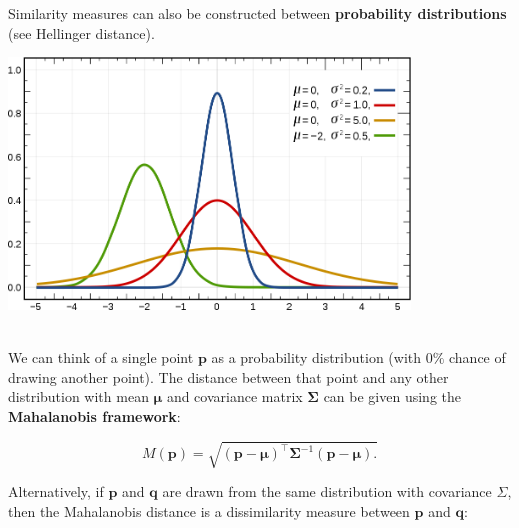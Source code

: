 \documentclass[20pt,landscape,footrule,headrule]{foils}
\newcommand{\newl}{\newline\newline}
\begin{document}
Similarity measures can also be constructed between \textbf{probability distributions} (see Hellinger distance). \newpage\  \begin{center}
\includegraphics[width=0.8\textwidth]{Images/distributions.png}
\end{center}\newpage \ \\ \noindent
We can think of a single point $\mathbf{p}$ as a probability distribution (with $0\%$ chance of drawing another point). \newl The distance between that point and any other distribution with mean $\mathbf{\mu}$ and covariance matrix $\mathbf{\Sigma}$ can be given using the \textbf{Mahalanobis framework}:

$$
M(\mathbf{p})=\sqrt{(\mathbf{p} - \mathbf{\mu})^{\!\top} \mathbf{\Sigma}^{-1} (\mathbf{p} - \mathbf{\mu}).}
$$

\noindent Alternatively, if $\mathbf{p}$ and $\mathbf{q}$ are drawn from the same distribution with covariance $\Sigma$, then the Mahalanobis distance is a dissimilarity measure between $\mathbf{p}$ and $\mathbf{q}$: 
\end{document}
